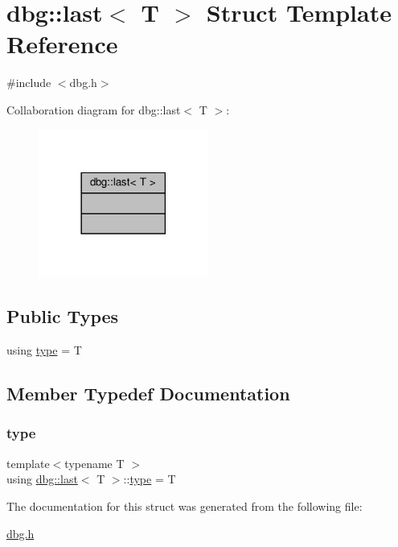 \hypertarget{structdbg_1_1last_3_01T_01_4}{}\section{dbg\+:\+:last$<$ T $>$ Struct Template Reference}
\label{structdbg_1_1last_3_01T_01_4}


{\ttfamily \#include $<$dbg.\+h$>$}



Collaboration diagram for dbg\+:\+:last$<$ T $>$\+:\nopagebreak
\begin{figure}[H]
\begin{center}
\leavevmode
\includegraphics[width=158pt]{da/d1d/structdbg_1_1last_3_01T_01_4__coll__graph}
\end{center}
\end{figure}
\subsection*{Public Types}
\begin{DoxyCompactItemize}
\item 
using \hyperlink{structdbg_1_1last_3_01T_01_4_a6715c2f60dfaa8a096517ce45ff43999}{type} = T
\end{DoxyCompactItemize}


\subsection{Member Typedef Documentation}
\mbox{\label{structdbg_1_1last_3_01T_01_4_a6715c2f60dfaa8a096517ce45ff43999}} 
\subsubsection{\texorpdfstring{type}{type}}
{\footnotesize\ttfamily template$<$typename T $>$ \\
using \hyperlink{structdbg_1_1last}{dbg\+::last}$<$ T $>$\+::\hyperlink{structdbg_1_1last_3_01T_01_4_a6715c2f60dfaa8a096517ce45ff43999}{type} =  T}



The documentation for this struct was generated from the following file\+:\begin{DoxyCompactItemize}
\item 
\hyperlink{dbg_8h}{dbg.\+h}\end{DoxyCompactItemize}
